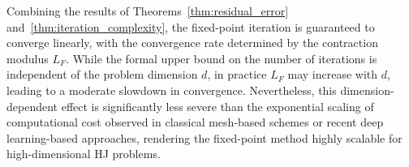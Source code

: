 \documentclass[review,hidelinks,onefignum,onetabnum]{siamart250106}
\begin{document}
Combining the results of Theorems~\ref{thm:residual_error} and~\ref{thm:iteration_complexity}, the fixed-point iteration is guaranteed to converge linearly, with the convergence rate determined by the contraction modulus \(L_F\). While the formal upper bound on the number of iterations is independent of the problem dimension \(d\), in practice \(L_F\) may increase with \(d\), leading to a moderate slowdown in convergence. Nevertheless, this dimension-dependent effect is significantly less severe than the exponential scaling of computational cost observed in classical mesh-based schemes or recent deep learning-based approaches, rendering the fixed-point method highly scalable for high-dimensional HJ problems.





\end{document}
